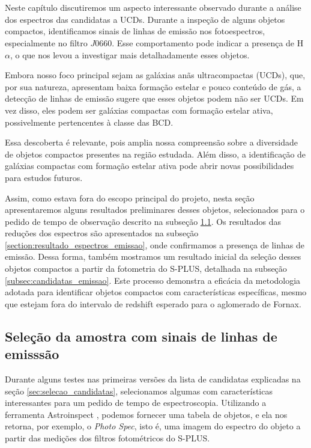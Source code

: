 \chapter{\chapternamespectraemission}\label{chap:spectra_emission}

Neste capítulo discutiremos um aspecto interessante observado durante a análise dos espectros das candidatas a UCDs. Durante a inspeção de alguns objetos compactos, identificamos sinais de linhas de emissão nos fotoespectros, especialmente no filtro $J0660$. Esse comportamento pode indicar a presença de H$\alpha$, o que nos levou a investigar mais detalhadamente esses objetos. 

Embora nosso foco principal sejam as galáxias anãs ultracompactas (UCDs), que, por sua natureza, apresentam baixa formação estelar e pouco conteúdo de gás, a detecção de linhas de emissão sugere que esses objetos podem não ser UCDs. Em vez disso, eles podem ser galáxias compactas com formação estelar ativa, possivelmente pertencentes à classe das \ac{BCD}. 

Essa descoberta é relevante, pois amplia nossa compreensão sobre a diversidade de objetos compactos presentes na região estudada. Além disso, a identificação de galáxias compactas com formação estelar ativa pode abrir novas possibilidades para estudos futuros.

Assim, como estava fora do escopo principal do projeto, nesta seção apresentaremos alguns resultados preliminares desses objetos, selecionados para o pedido de tempo de observação descrito na subseção \ref{section:candidatas_emissao}. Os resultados das reduções dos espectros são apresentados na subseção \ref{section:resultado_espectros_emissao}, onde confirmamos a presença de linhas de emissão. Dessa forma, também mostramos um resultado inicial da seleção desses objetos compactos a partir da fotometria do S-PLUS, detalhada na subseção \ref{subsec:candidatas_emissao}. Este processo demonstra a eficácia da metodologia adotada para identificar objetos compactos com características específicas, mesmo que estejam fora do intervalo de redshift esperado para o aglomerado de Fornax.

\section{Seleção da amostra com sinais de linhas de emisssão}\label{section:candidatas_emissao}

Durante alguns testes nas primeiras versões da lista de candidatas explicadas na seção \ref{sec:selecao_candidatas}, selecionamos algumas com características interessantes para um pedido de tempo de espectroscopia. Utilizando a ferramenta Astroinspect \cite{astroinspect}, podemos fornecer uma tabela de objetos, e ela nos retorna, por exemplo, o \textit{Photo Spec}, isto é, uma imagem do espectro do objeto a partir das medições dos filtros fotométricos do S-PLUS.

